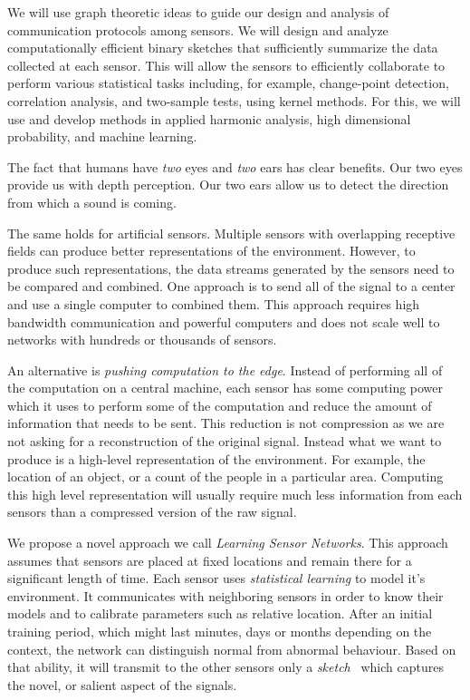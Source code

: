 \documentclass{article}
\begin{document}
We will use graph theoretic ideas to guide our design and analysis of communication protocols among sensors. We will design and analyze computationally efficient binary sketches that sufficiently summarize the data collected at each sensor. This will allow the sensors to efficiently collaborate to perform various statistical tasks including, for example, change-point detection, correlation analysis, and two-sample tests, using kernel methods. For this, we will use and develop methods in applied harmonic analysis, high dimensional probability, and machine learning.   






\iffalse The fact that humans have {\em two} eyes and {\em two} ears has clear
benefits. Our two eyes provide us with depth perception. Our two ears
allow us to detect the direction from which a sound is coming.

The same holds for artificial sensors. Multiple sensors with
overlapping receptive fields can produce better representations of the
environment. However, to produce such representations, the data
streams generated by the sensors need to be compared and combined. One
approach is to send all of the signal to a center and use a single
computer to combined them. This approach requires high bandwidth
communication and powerful computers and does not scale well to
networks with hundreds or thousands of sensors.

An alternative is {\em pushing computation to the edge}. Instead of
performing all of the computation on a central machine, each sensor
has some computing power which it uses to perform some of the
computation and reduce the amount of information that needs to be
sent. This reduction is not compression as we are not asking for a
reconstruction of the original signal. Instead what we want to produce
is a high-level representation of the environment. For example, the
location of an object, or a count of the people in a particular
area. Computing this high level representation will usually require
much less information from each sensors than a compressed version of
the raw signal.

We propose a novel approach we call {\em Learning Sensor Networks}.
This approach assumes that sensors are placed at fixed locations and
remain there for a significant length of time.  Each sensor uses {\em
  statistical learning} to model it's environment. It communicates
with neighboring sensors in order to know their models and to
calibrate parameters such as relative location. After an initial
training period, which might last minutes, days or months depending on
the context, the network can distinguish normal from abnormal
behaviour. Based on that ability, it will transmit to the other
sensors only a {\em sketch}~\cite{} which captures the novel, or
salient aspect of the signals.
\end{document}
